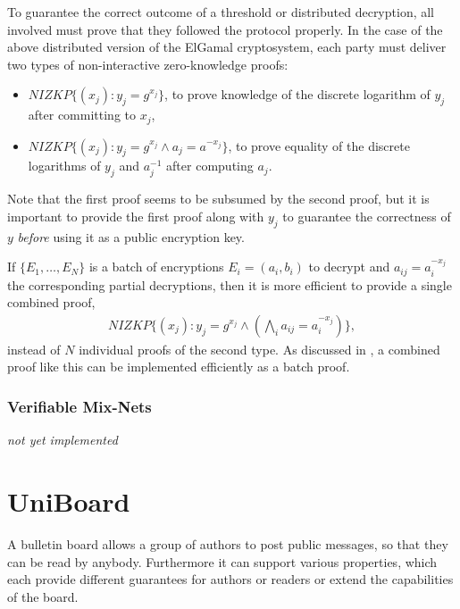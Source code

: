 \documentclass[bibtotoc,halfparskip,oneside]{scrreprt}
\begin{document}
To guarantee the correct outcome of a threshold or distributed decryption, all involved must prove that they followed the protocol properly. In the case of the above distributed version of the ElGamal cryptosystem, each party must deliver two types of non-interactive zero-knowledge proofs:
\begin{itemize}
\item $\mathit{NIZKP}\{(x_j):y_j=g^{x_j}\}$, to prove knowledge of the discrete logarithm of $y_j$ after committing to $x_j$,
\item $\mathit{NIZKP}\{(x_j):y_j=g^{x_j} \wedge a_j=a^{-x_j}\}$, to prove equality of the discrete logarithms of $y_j$ and $a_j^{-1}$ after computing $a_j$.
\end{itemize}
Note that the first proof seems to be subsumed by the second proof, but it is important to provide the first proof along with $y_j$ to guarantee the correctness of $y$ \emph{before} using it as a public encryption key.

If $\{E_1,\ldots,E_N\}$ is a batch of encryptions $E_i=(a_i,b_i)$ to decrypt and $a_{ij}=a_i^{-x_j}$ the corresponding partial decryptions, then it is more efficient to provide a single combined  proof,
\begin{align}
\mathit{NIZKP}\{(x_j):y_j=g^{x_j} \wedge (\bigwedge_i a_{ij}=a_i^{-x_j})\},
\end{align}
instead of $N$ individual proofs of the second type. As discussed in , a combined proof like this can be implemented efficiently as a batch proof.

\subsection{Verifiable Mix-Nets}

\emph{not yet implemented}
\chapter{UniBoard}
A bulletin board allows  a group of authors to post public messages, so that they can be read by anybody. Furthermore it can support various properties, which each provide different guarantees for authors or readers or extend the capabilities of the board.
\end{document}
